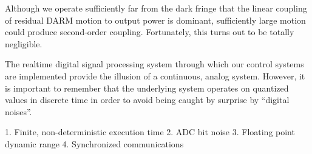 %
Although we operate sufficiently far from the dark fringe that the
linear coupling of residual DARM motion to output power is dominant,
sufficiently large motion could produce second-order coupling. Fortunately,
this turns out to be totally negligible.



The realtime digital signal processing system through which our
control systems are implemented provide the illusion of a continuous,
analog system.  However, it is important to remember that the
underlying system operates on quantized values in discrete time in
order to avoid being caught by surprise by ``digital noises''.

1. Finite, non-deterministic execution time
2. ADC bit noise
3. Floating point dynamic range
4. Synchronized communications
